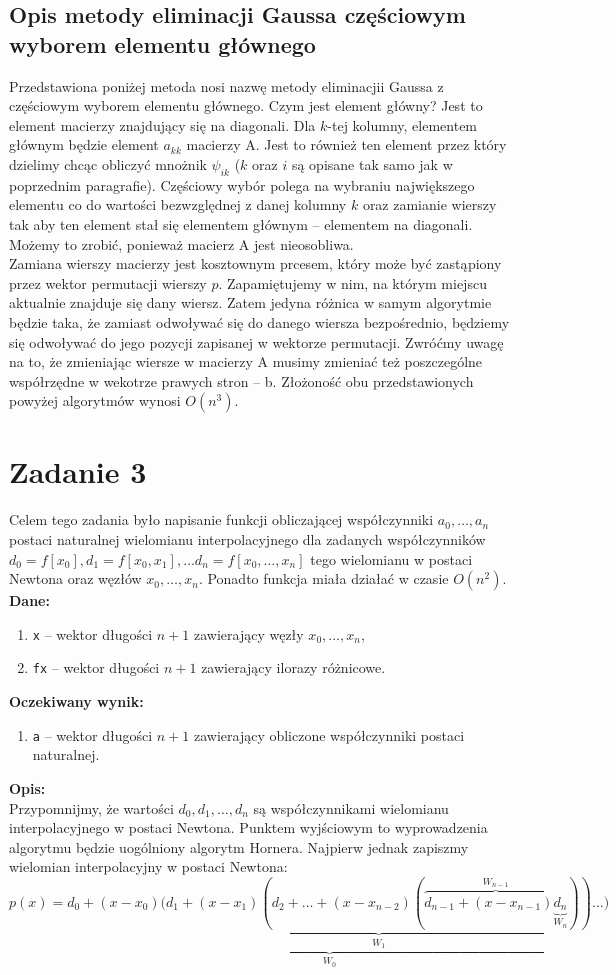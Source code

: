 \documentclass[]{article}
\begin{document}
	\subsection*{Opis metody eliminacji Gaussa częściowym wyborem elementu głównego}
	Przedstawiona poniżej metoda nosi nazwę metody eliminacjii Gaussa z częściowym wyborem elementu głównego.
	Czym jest element główny? Jest to element macierzy znajdujący się na diagonali. Dla $k$-tej kolumny, elementem głównym będzie element $a_{kk}$ macierzy A. Jest to również ten element przez który dzielimy chcąc obliczyć mnożnik $\psi_{ik}$ ($k$ oraz $i$ są opisane tak samo jak w poprzednim paragrafie). Częściowy wybór polega na wybraniu największego elementu co do wartości bezwzględnej z danej kolumny $k$ oraz zamianie wierszy tak aby ten element stał się elementem głównym -- elementem na diagonali. Możemy to zrobić, ponieważ macierz A jest nieosobliwa. \\
	Zamiana wierszy macierzy jest kosztownym prcesem, który może być zastąpiony przez wektor permutacji wierszy $p$. Zapamiętujemy w nim, na którym miejscu aktualnie znajduje się dany wiersz. Zatem jedyna różnica w samym algorytmie będzie taka, że zamiast odwoływać się do danego wiersza bezpośrednio, będziemy się odwoływać do jego pozycji zapisanej w wektorze permutacji. Zwróćmy uwagę na to, że zmieniając wiersze w macierzy A musimy zmieniać też poszczególne współrzędne w wekotrze prawych stron -- b. Złożoność obu przedstawionych powyżej algorytmów wynosi $O(n^3)$.
	
	
	\section*{Zadanie 3} 
	
	Celem tego zadania było napisanie funkcji obliczającej współczynniki $a_0,\ldots,a_n$ postaci naturalnej wielomianu interpolacyjnego dla zadanych współczynników $d_0 = f[x_0], d_1 = f[x_0,x_1], \ldots d_n = f[x_0, \ldots, x_n]$ tego wielomianu w postaci Newtona oraz węzłów $x_0, \ldots, x_n$. Ponadto funkcja miała działać w czasie $O(n^2)$.\\
	\textbf{Dane:}
	\begin{enumerate}[]
		\item \texttt{x} -- wektor długości $n+1$ zawierający węzły $x_0, \ldots, x_n$,
		\item \texttt{fx} -- wektor długości $n+1$ zawierający ilorazy różnicowe.
	\end{enumerate}
	\textbf{Oczekiwany wynik:}
	\begin{enumerate}[]
		\item \texttt{a} -- wektor długości $n+1$ zawierający obliczone współczynniki postaci naturalnej.
	\end{enumerate}
	\textbf{Opis:}\\
	Przypomnijmy, że wartości $d_0, d_1, \ldots, d_n$ są współczynnikami wielomianu interpolacyjnego w postaci Newtona. Punktem wyjściowym to wyprowadzenia algorytmu będzie uogólniony algorytm Hornera. Najpierw jednak zapiszmy wielomian interpolacyjny w postaci Newtona: 
	$$ p(x) = \underbrace{d_0 + (x-x_0)(\underbrace{d_1 + (x-x_1)
	(d_2 + \ldots + (x-x_{n-2})(\overbrace{d_{n-1}+(x-x_{n-1})\underbrace{d_n}_{W_n}}^{W_{n-1}}))}_{W_1}}_{W_0}\ldots)$$
\end{document}

